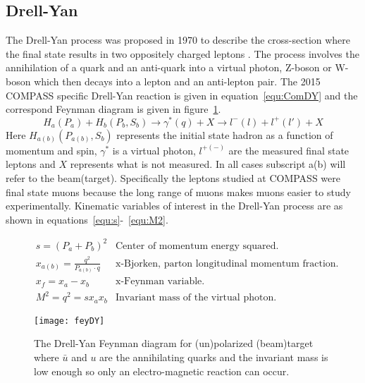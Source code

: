 \subsection{Drell-Yan}

The Drell-Yan process was proposed in 1970 to describe the
cross-section where the final state results in two oppositely charged
leptons \cite{DY_process}.  The process involves the annihilation of a
quark and an anti-quark into a virtual photon, Z-boson or W-boson
which then decays into a lepton and an anti-lepton pair.  The 2015
COMPASS specific Drell-Yan reaction is given in
equation~\ref{equ:ComDY} and the correspond Feynman diagram is given in figure~\ref{fig:fey_DY}.
%
\begin{equation}
  H_a(P_a) + H_b(P_b, S_b) \rightarrow \gamma ^*(q) + X \rightarrow l^-(l) + l^+(l') + X
  \label{equ:ComDY}
\end{equation}
%
Here $H_{a(b)}(P_{a(b)}, S_b)$ represents the initial state hadron as
a function of momentum and spin, $\gamma^{*}$ is a virtual photon,
$l^{+(-)}$ are the measured final state leptons and $X$ represents
what is not measured.  In all cases subscript a(b) will refer to the
beam(target).  Specifically the leptons studied at COMPASS were final
state muons because the long range of muons makes muons easier to study experimentally. Kinematic variables of
interest in the Drell-Yan process are as shown in
equations~\ref{equ:s}-~\ref{equ:M2}.

\begin{subequations}
  \begin{align}
    &s = (P_a + P_b)^2    & \text{Center of momentum energy squared.}\label{equ:s}\\
    &x_{a(b)} = \frac{q^2}{P_{a(b)} \cdot q} & \text{x-Bjorken, parton longitudinal momentum fraction.} \\
    &x_f = x_a - x_b & \text{x-Feynman variable.}\\
    &M^2 = q^2 = sx_ax_b & \text{Invariant mass of the virtual photon.}\label{equ:M2}
  \end{align}
  \label{equ:DYkin}
\end{subequations}

\begin{figure}
  \texttt{[image: feyDY]}
  \caption{}{The Drell-Yan Feynman diagram for (un)polarized
    (beam)target where $\bar{u}$ and $u$ are the annihilating quarks
    and the invariant mass is low enough so only an electro-magnetic
    reaction can occur.}
  \label{fig:fey_DY}
\end{figure}

